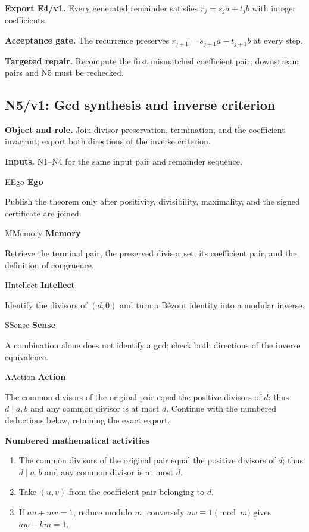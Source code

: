 \documentclass[preprint,12pt,aps,pra,showkeys,amsmath,amssymb,superscriptaddress,floatfix]{revtex4-2}
\theoremstyle{definition}
\theoremstyle{remark}
\newcommand{\mmfaculty}[3]{%
 \begin{mmfacultybox}{#1}{#2}
 {\sffamily\bfseries\color{MMBlue}#2}\par\smallskip #3
 \end{mmfacultybox}}
\newcommand{\field}[2]{\par\smallskip\noindent\textbf{#1.} #2\par}
\begin{document}
\field{Export E4/v1}{Every generated remainder satisfies \(r_j=s_ja+t_jb\) with integer
coefficients.}

\field{Acceptance gate}{The recurrence preserves \(r_{j+1}=s_{j+1}a+t_{j+1}b\) at every step.}

\field{Targeted repair}{Recompute the first mismatched coefficient pair; downstream pairs and N5
must be rechecked.}

\clearpage

\subsection{N5/v1: Gcd synthesis and inverse criterion}

\field{Object and role}{Join divisor preservation, termination, and the coefficient invariant;
export both directions of the inverse criterion.}

\field{Inputs}{N1--N4 for the same input pair and remainder sequence.}

\mmfaculty{E}{Ego}{Publish the theorem only after positivity, divisibility, maximality, and
the signed certificate are joined.}

\mmfaculty{M}{Memory}{Retrieve the terminal pair, the preserved divisor set, its coefficient
pair, and the definition of congruence.}

\mmfaculty{I}{Intellect}{Identify the divisors of \((d,0)\) and turn a Bézout identity into a
modular inverse.}

\mmfaculty{S}{Sense}{A combination alone does not identify a gcd; check both directions of
the inverse equivalence.}

\mmfaculty{A}{Action}{The common divisors of the original pair equal the positive divisors of
\(d\); thus \(d\mid a,b\) and any common divisor is at most \(d\).
Continue with the numbered deductions below, retaining the exact export.}

\smallskip\noindent\textbf{Numbered mathematical activities}

\begin{enumerate}[label=N5.\arabic*,leftmargin=3.4em]

\item The common divisors of the original pair equal the positive divisors of
\(d\); thus \(d\mid a,b\) and any common divisor is at most \(d\).

\item Take \((u,v)\) from the coefficient pair belonging to \(d\).

\item If \(au+mv=1\), reduce modulo \(m\); conversely \(aw\equiv1\pmod m\)
gives \(aw-km=1\).

\end{enumerate}
\end{document}
